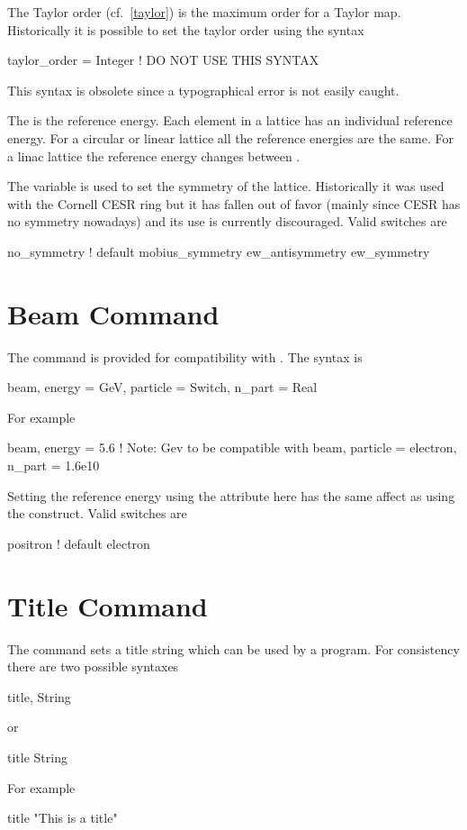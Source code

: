 The Taylor order (cf.~\ref{taylor}) is the maximum order for a Taylor map.
Historically it is possible to set the taylor order using the syntax
\begin{example}
  taylor_order = Integer   ! DO NOT USE THIS SYNTAX
\end{example}
This syntax is obsolete since a typographical error is not easily caught.

The  is the reference energy.  Each element in a lattice 
has an individual reference energy. For a circular or linear lattice all 
the reference energies are the same. For a linac lattice
the reference energy changes between .

The  variable is used to set the symmetry of the lattice.
Historically it was used with the Cornell CESR ring but it has fallen 
out of favor (mainly since CESR has no symmetry nowadays) and its use
is currently discouraged. Valid  switches are
\begin{example}
  no\_symmetry         ! default
  mobius\_symmetry
  ew\_antisymmetry
  ew\_symmetry
\end{example}


\section{Beam Command}

The  command is provided for compatibility with \mad. The syntax is
\begin{example}
  beam, energy = GeV, particle = Switch, n_part = Real
\end{example}
For example
\begin{example}
  beam, energy = 5.6  ! Note: Gev to be compatible with \mad
  beam, particle = electron, n_part = 1.6e10
\end{example}
Setting the reference energy using the  attribute here has the same
affect as using the  construct. Valid 
switches are
\begin{example}
  positron  ! default
  electron
\end{example}

\section{Title Command}
The  command sets a title string which can be used by a program. 
For consistency there are two possible syntaxes
\begin{example}
  title, String
\end{example}
or
\begin{example}
  title
  String
\end{example}
For example
\begin{example}
  title
  "This is a title"
\end{example}

